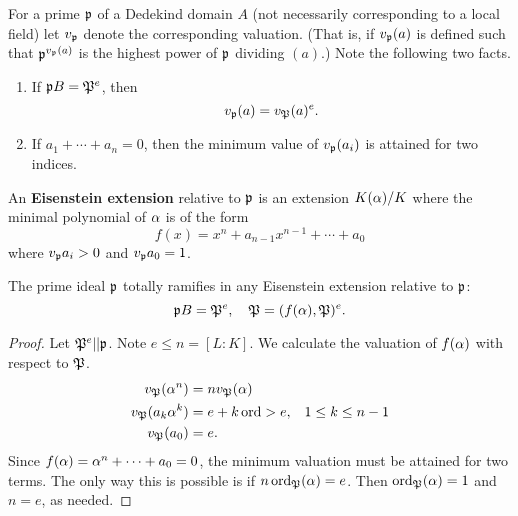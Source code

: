 For a prime $\mathfrak{p}$ of a Dedekind domain $A$ (not necessarily corresponding to a local field) let $v_{\mathfrak{p}}$ denote the corresponding valuation. (That is, if $v_{\mathfrak{p}}(a)$ is defined such that $\mathfrak{p}^{v_{\mathfrak{p}}(a)}$ is the highest power of $\mathfrak{p}$ dividing $(a)$.) 
Note the following two facts.
\begin{enumerate}
\item If $\mathfrak{p} B=\mathfrak{P}^e$, then
\[
v_{\mathfrak{p}}(a)=v_{\mathfrak{P}}(a)^e.
\]
\item If $a_1+\cdots +a_n=0$, then the minimum value of $v_{\mathfrak{p}}(a_i)$ is attained for two indices.
\end{enumerate}
\begin{df}
An \textbf{Eisenstein extension} relative to $\mathfrak{p}$ is an extension $K(\alpha)/K$ where the minimal polynomial of $\alpha$ is of the form
\[
f(x)=x^n+a_{n-1}x^{n-1}+\cdots +a_0
\]
where $v_{\mathfrak{p}} a_i>0$ and $v_{\mathfrak{p}} a_0=1$.
\end{df}
\begin{thm}
The prime ideal $\mathfrak{p}$ totally ramifies in any Eisenstein extension relative to $\mathfrak{p}$:
\[
\mathfrak{p} B=\mathfrak{P}^e, \quad \mathfrak{P}=(f(\alpha), \mathfrak{P})^e.
\]
\end{thm}
\begin{proof}
Let $\mathfrak{P}^e|| \mathfrak{p}$. Note $e\le n=[L:K]$.
We calculate the valuation of $f(\alpha)$ with respect to $\mathfrak{P}$.
\begin{align*}
v_{\mathfrak{P}}(\alpha^n)&= nv_{\mathfrak{P}}(\alpha)\\
v_{\mathfrak{P}}(a_k\alpha^k)&= e+k\operatorname{ord}>e,&1\le k\le n-1\\
v_{\mathfrak{P}}(a_0)&=e.
\end{align*}
Since $f(\alpha)=\alpha^n+\cdots +a_0=0$, the minimum valuation must be attained for two terms. The only way this is possible is if $n\operatorname{ord}_{\mathfrak{P}}(\alpha)=e$. Then  $\operatorname{ord}_{\mathfrak{P}}(\alpha)=1$ and $n=e$, as needed.
\end{proof}

